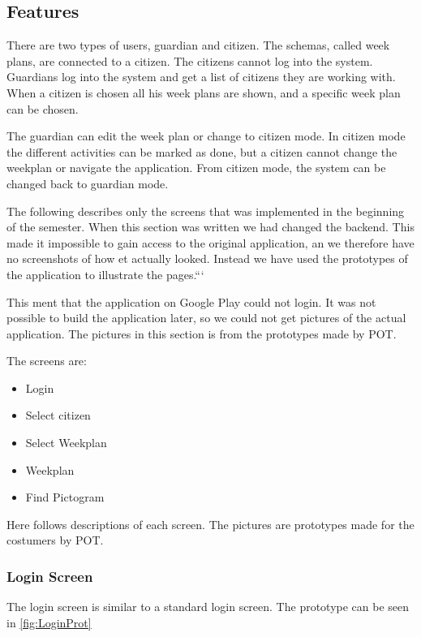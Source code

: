 \subsection{Features}
There are two types of users, \gls{guardian} and \gls{citizen}. The schemas, called week plans, are connected to a \gls{citizen}. The \glspl{citizen} cannot log into the system. Guardians log into the system and get a list of citizens they are working with. When a \gls{citizen} is chosen all his week plans are shown, and a specific week plan can be chosen. 

The guardian can edit the week plan or change to citizen mode. In citizen mode the different activities can be marked as done, but a citizen cannot change the weekplan or navigate the application. From citizen mode, the system can be changed back to guardian mode.

The following describes only the screens that was implemented in the beginning of the semester. When this section was written we had changed the backend. This made it impossible to gain access to the original application, an we therefore have no screenshots of how et actually looked. Instead we have used the prototypes of the application to illustrate the pages.```

This ment that the application on Google Play could not login. It was not possible to build the application later, so we could not get pictures of the actual application. The pictures in this section is from the prototypes made by \gls{POT}.


The screens are:
\begin{itemize}
    \item Login
    \item Select citizen 
    \item Select Weekplan 
    \item Weekplan
    \item Find Pictogram
\end{itemize}

Here follows descriptions of each screen. The pictures are prototypes made for the costumers by \gls{POT}. 

\subsubsection*{Login Screen}
The login screen is similar to a standard login screen. The prototype can be seen in \ref{fig:LoginProt}

